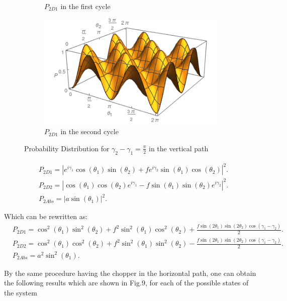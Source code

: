 \documentclass[12pt]{article}
\begin{document}
\begin{figure}[t!]
\begin{subfigure}[b]{0.45\linewidth}
\caption{$P_{2D1} $ in the first cycle}
\label{fig:westminster_aerea}
\end{subfigure}
\begin{subfigure}[b]{0.45\linewidth}
\includegraphics[width=\linewidth,height=3 cm]{images/Pc2D12.png}
\caption{$P_{2D1} $ in the second cycle }
\label{fig:BS1}
\end{subfigure}
\caption{Probability Distribution for $\gamma_{2}-\gamma_{1}=\frac{\pi}{2}$ in the vertical path}
\label{fig:westminster}
\end{figure}


\begin{align}
&P_{2D1}=|e^{i\gamma_{1}}\cos(\theta_{1})\sin(\theta_{2})+f e^{i\gamma_{2}}\sin(\theta_{1})\cos(\theta_{2})|^2.\\
&P_{2D2}=|\cos(\theta_{1})\cos(\theta_{2})e^{i\gamma_{1}}- f \sin(\theta_{1})\sin(\theta_{2})e^{i\gamma_{2}}|^2.\\
&P_{2Abs}=|a \sin(\theta_{1})|^2.
\end{align}

Which can be rewritten as:
\begin{align}
& P_{2D1}=\cos^2(\theta_{1})\sin^2(\theta_{2})+f^2 \sin^2(\theta_{1})\cos^2(\theta_{2})+\frac{f \sin(2\theta_{1})\sin(2\theta_{2})\cos(\gamma_{1}-\gamma_{2})}{2}.\\
& P_{2D2}=\cos^2(\theta_{1})\cos^2(\theta_{2})+ f^2 \sin^2(\theta_{1})\sin^2(\theta_{2})-\frac{f \sin(2\theta_{1})\sin(2\theta_{2})\cos(\gamma_{1}-\gamma_{2})}{2}.\\
& P_{2Abs}=a^2 \sin^2(\theta_{1}).
\end{align}

By the same procedure having the chopper in the horizontal path, one can obtain the following results which are shown in Fig.9, for each of the possible states of the system
 
\end{document}

